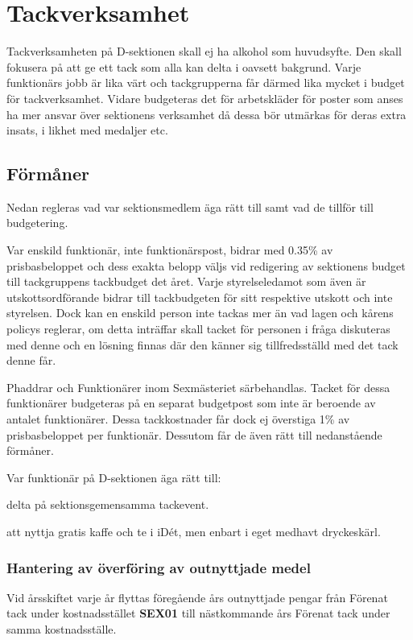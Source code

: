 \documentclass{dsekprotokoll}
\begin{document}
\section{Tackverksamhet}
Tackverksamheten på D-sektionen skall ej ha alkohol som huvudsyfte. Den skall fokusera på att ge ett tack som alla kan delta i oavsett bakgrund. Varje funktionärs jobb är lika värt och tackgrupperna får därmed lika mycket i budget för tackverksamhet. Vidare budgeteras det för arbetskläder för poster som anses ha mer ansvar över sektionens verksamhet då dessa bör utmärkas för deras extra insats, i likhet med medaljer etc.
\subsection{Förmåner}
\par Nedan regleras vad var sektionsmedlem äga rätt till samt vad de tillför till budgetering.
\par Var enskild funktionär, inte funktionärspost, bidrar med 0.35\% av prisbasbeloppet och dess
exakta belopp väljs vid redigering av sektionens budget till tackgruppens tackbudget det året. Varje styrelseledamot som även är utskottsordförande bidrar till tackbudgeten för sitt respektive utskott och inte styrelsen. Dock kan en enskild person inte tackas mer än vad lagen och kårens policys reglerar, om detta inträffar skall tacket för personen i fråga diskuteras med denne och en lösning finnas där den känner sig tillfredsställd med det tack denne får.
\par Phaddrar och Funktionärer inom Sexmästeriet särbehandlas. Tacket för dessa funktionärer budgeteras på en separat budgetpost som inte är beroende av antalet funktionärer. Dessa tackkostnader får dock ej överstiga 1\% av prisbasbeloppet per funktionär. Dessutom får de även rätt till nedanstående förmåner.

Var funktionär på D-sektionen äga rätt till:
\begin{attlista}
  \item delta på sektionsgemensamma tackevent.
  \item att nyttja gratis kaffe och te i iDét, men enbart i eget medhavt dryckeskärl.
\end{attlista}

\subsubsection{Hantering av överföring av outnyttjade medel}
Vid årsskiftet varje år flyttas föregående års outnyttjade pengar från Förenat tack
under kostnadsstället \textbf{SEX01} till nästkommande års Förenat tack under samma
kostnadsställe.
\end{document}
